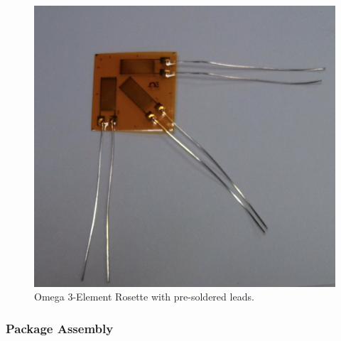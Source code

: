 \begin{figure}[h!]
\centering
\includegraphics[width=\textwidth]{./MCINTOSH_Images/Strain_Gauge_with_Leads.png}
\caption{Omega 3-Element Rosette with pre-soldered leads.}
\label{fig:OmegaSoldered}
\end{figure}

\subsubsection{Package Assembly}

